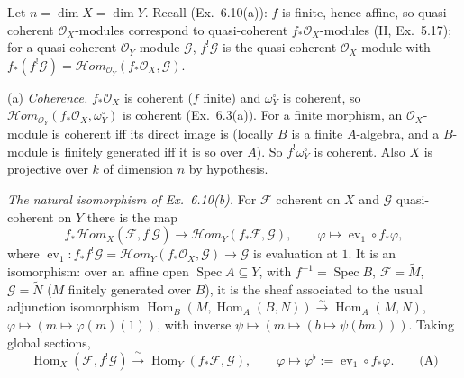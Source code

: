 \documentclass[11pt]{article}
\begin{document}
\pf
Let $n=\dim X=\dim Y$. Recall (Ex.~6.10(a)): $f$ is finite, hence affine, so quasi-coherent $\mathcal O_X$-modules correspond to quasi-coherent $f_*\mathcal O_X$-modules (II, Ex.~5.17); for a quasi-coherent $\mathcal O_Y$-module $\mathcal G$, $f^!\mathcal G$ is the quasi-coherent $\mathcal O_X$-module with $f_*(f^!\mathcal G)=\mathcal Hom_{\mathcal O_Y}(f_*\mathcal O_X,\mathcal G)$.

(a) \emph{Coherence.} $f_*\mathcal O_X$ is coherent ($f$ finite) and $\omega^\circ_Y$ is coherent, so $\mathcal Hom_{\mathcal O_Y}(f_*\mathcal O_X,\omega^\circ_Y)$ is coherent (Ex.~6.3(a)). For a finite morphism, an $\mathcal O_X$-module is coherent iff its direct image is (locally $B$ is a finite $A$-algebra, and a $B$-module is finitely generated iff it is so over $A$). So $f^!\omega_Y^\circ$ is coherent. Also $X$ is projective over $k$ of dimension $n$ by hypothesis.

\emph{The natural isomorphism of Ex.~6.10(b).} For $\mathcal F$ coherent on $X$ and $\mathcal G$ quasi-coherent on $Y$ there is the map
\[
f_*\mathcal Hom_X(\mathcal F,f^!\mathcal G)\longrightarrow\mathcal Hom_Y(f_*\mathcal F,\mathcal G),\qquad \varphi\longmapsto \operatorname{ev}_1\circ f_*\varphi,
\]
where $\operatorname{ev}_1\colon f_*f^!\mathcal G=\mathcal Hom_Y(f_*\mathcal O_X,\mathcal G)\to\mathcal G$ is evaluation at $1$. It is an isomorphism: over an affine open $\operatorname{Spec}A\subseteq Y$, with $f^{-1}=\operatorname{Spec}B$, $\mathcal F=\tilde M$, $\mathcal G=\tilde N$ ($M$ finitely generated over $B$), it is the sheaf associated to the usual adjunction isomorphism $\operatorname{Hom}_B(M,\operatorname{Hom}_A(B,N))\xrightarrow{\sim}\operatorname{Hom}_A(M,N)$, $\varphi\mapsto(m\mapsto\varphi(m)(1))$, with inverse $\psi\mapsto(m\mapsto(b\mapsto\psi(bm)))$. Taking global sections,
\[
\operatorname{Hom}_X(\mathcal F,f^!\mathcal G)\xrightarrow{\ \sim\ }\operatorname{Hom}_Y(f_*\mathcal F,\mathcal G),\qquad\varphi\mapsto\varphi^\flat:=\operatorname{ev}_1\circ f_*\varphi .\qquad\text{(A)}
\]
\end{document}
